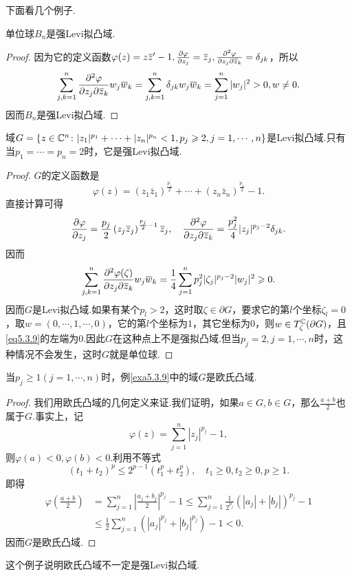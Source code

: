 下面看几个例子.
\begin{example}\label{exa5.3.8}
单位球$B_n$是强Levi拟凸域.	
\end{example}
\begin{proof}
	因为它的定义函数$\varphi(z)=z{}\mkern1mu\overline{\mkern-1muz}'-1,\frac{\partial \varphi}{\partial z_j}={}\mkern1mu\overline{\mkern-1muz}_j,\frac{\partial^2 \varphi}{\partial z_j\partial {}\mkern1mu\overline{\mkern-1muz}_k}=\delta_{jk}$，所以
	\[\sum_{j,k=1}^{n}\frac{\partial^2 \varphi}{\partial z_j\partial {}\mkern1mu\overline{\mkern-1muz}_k}w_j{}\mkern1mu\overline{\mkern-1muw}_k=\sum_{j,k=1}^{n}\delta_{jk}w_j{}\mkern1mu\overline{\mkern-1muw}_k=\sum_{j=1}^{n}|w_j|^2>0,w\neq0.\]
	因而$B_n$是强Levi拟凸域.
\end{proof}
\begin{example}\label{exa5.3.9}
	域$G=\{z\in\mathbb C^n\colon|z_1|^{p_1}+\cdots+|z_n|^{p_n}<1,p_j\geqslant2,j=1,\cdots,n\}$是Levi拟凸域.只有当$p_1=\cdots=p_n=2$时，它是强Levi拟凸域.
\end{example}
\begin{proof}
	$G$的定义函数是
	\[\varphi(z)=\left(z_1\bar{z}_1\right)^{\frac{p_1}2}+\cdots+\left(z_n\bar{z}_n\right)^{\frac{p_n}2}-1.\]
	直接计算可得
	\[\frac{\partial \varphi}{\partial z_j}=\frac{p_j}{2}\left(z_j{}\mkern1mu\overline{\mkern-1muz}_j\right)^{\frac{p_j}{2}-1}{}\mkern1mu\overline{\mkern-1muz}_j,\quad 
	\frac{\partial^2 \varphi}{\partial z_j\partial {}\mkern1mu\overline{\mkern-1muz}_k}=\frac{p_j^2}{4}|z_j|^{p_j-2}\delta_{jk}.\]
	因而
	\begin{equation}\label{eq5.3.9}
		\sum_{j,k=1}^{n}\frac{\partial^2 \varphi(\zeta)}{\partial z_j\partial {}\mkern1mu\overline{\mkern-1muz}_k}w_j{}\mkern1mu\overline{\mkern-1muw}_k=\frac14\sum_{j=1}^{n}p_j^2 |\zeta_j|^{p_j-2}|w_j|^2\geqslant0.	\end{equation}
	因而$G$是Levi拟凸域.如果有某个$p_l>2$，这时取$\zeta\in\partial G$，要求它的第$l$个坐标$\zeta_l=0$，取$w=(0,\cdots,1,\cdots,0)$，它的第$l$个坐标为$1$，其它坐标为$0$，则$w\in T_\zeta^\mathbb C(\partial G)$，且\eqref{eq5.3.9}的左端为$0$.因此$G$在这种点上不是强拟凸域.但当$p_j=2,j=1,\cdots,n$时，这种情况不会发生，这时$G$就是单位球.
\end{proof}
\begin{example}\label{exa5.3.10}
	当$p_j\ge1(j=1,\cdots,n)$时，例\ref{exa5.3.9}中的域$G$是欧氏凸域.
\end{example}
\begin{proof}
	我们用欧氏凸域的几何定义来证.我们证明，如果$a\in G,b\in G$，那么$\frac{a+b}{2}$也属于$G$.事实上，记
	\[\varphi(z)=\sum_{j=1}^{n}|z_j|^{p_j}-1,\]
	则$\varphi(a)<0,\varphi(b)<0$.利用不等式
	\[(t_1+t_2)^p \le 2^{p-1}(t_1^p+t_2^p),\quad t_1\ge0,t_2\ge0,p\ge1.\]
	即得
	\begin{align*}
		\varphi\left(\frac{a+b}{2}\right)
		&=\sum_{j=1}^{n}\left|\frac{a_j+b_j}{2}\right|^{p_j}-1\le\sum_{j=1}^{n}\frac{1}{2^{p_j}}\left(|a_j|+|b_j|\right)^{p_j}-1\\
		&\le\frac12\sum_{j=1}^{n}\left(|a_j|^{p_j}+|b_j|^{p_j}\right)-1<0.
	\end{align*}
因而$G$是欧氏凸域.
\end{proof}
这个例子说明欧氏凸域不一定是强Levi拟凸域.
